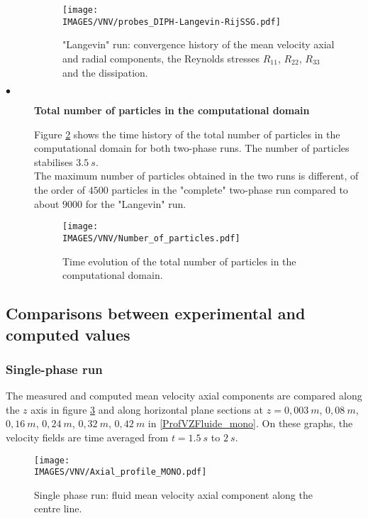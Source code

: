 \begin{description}
         \begin{figure}[H]
            \centerline{\texttt{[image: \\IMAGES/VNV/probes\_DIPH-Langevin-RijSSG.pdf]}}
            \caption{"Langevin" run: convergence history of the mean velocity axial and radial components, the Reynolds stresses $R_{11}$, $R_{22}$, $R_{33}$ and the dissipation.}
            \label{Histo_Lang} 
         \end{figure}


   \item[$\bullet$] \textbf{Total number of particles in the computational domain}

         Figure \ref{nbpart} shows the time history of the total number of particles in the computational domain for both two-phase runs. The number of particles stabilises $3.5~s$. \\ The maximum number of particles obtained in the two runs is different, of the order of $4500$ particles in the "complete" two-phase run compared to about $9000$ for the "Langevin" run.\\

         \begin{figure}[H]
            \centerline{\texttt{[image: \\IMAGES/VNV/Number\_of\_particles.pdf]}}
            \caption{Time evolution of the total number of particles in the computational domain.}
            \label{nbpart}
         \end{figure}

\end{description}

\clearpage

\subsection{Comparisons between experimental and computed values}

\subsubsection{Single-phase run}

The measured and computed mean velocity axial components are compared along the $z$ axis in figure \ref{AxeFluide_mono} and along horizontal plane sections at $z = 0,003~m$, $0,08~m$, $0,16~m$, $0,24~m$, $0,32~m$, $0,42~m$ in \ref{ProfVZFluide_mono}. On these graphs, the velocity fields are time averaged from $t=1.5~s$ to $2~s$.

\begin{figure}[H]
   \centerline{\texttt{[image: \\IMAGES/VNV/Axial\_profile\_MONO.pdf]}}
   \caption{Single phase run: fluid mean velocity axial component along the centre line.}
   \label{AxeFluide_mono}
\end{figure}

